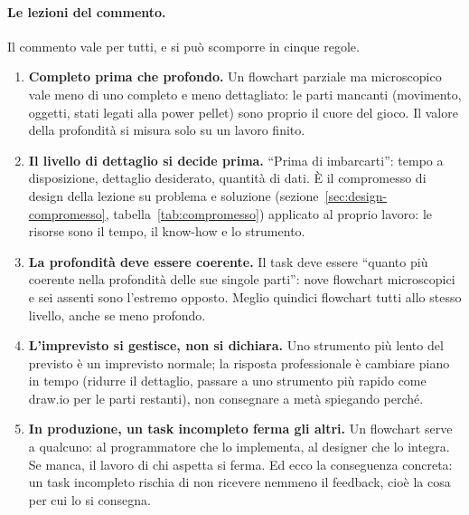 \paragraph{Le lezioni del commento.} Il commento vale per tutti, e si può
scomporre in cinque regole.
\begin{enumerate}
  \item \textbf{Completo prima che profondo.} Un flowchart parziale ma
        microscopico vale meno di uno completo e meno dettagliato: le parti
        mancanti (movimento, oggetti, stati legati alla power pellet) sono
        proprio il cuore del gioco. Il valore della profondità si misura solo
        su un lavoro finito.
  \item \textbf{Il livello di dettaglio si decide prima.} ``Prima di
        imbarcarti'': tempo a disposizione, dettaglio desiderato, quantità di
        dati. È il compromesso di design della lezione su problema e soluzione
        (sezione~\ref{sec:design-compromesso},
        tabella~\ref{tab:compromesso}) applicato al proprio lavoro: le risorse
        sono il tempo, il know-how e lo strumento.
  \item \textbf{La profondità deve essere coerente.} Il task deve essere ``quanto
        più coerente nella profondità delle sue singole parti'': nove
        flowchart microscopici e sei assenti sono l'estremo opposto. Meglio
        quindici flowchart tutti allo stesso livello, anche se meno
        profondo.
  \item \textbf{L'imprevisto si gestisce, non si dichiara.} Uno strumento più
        lento del previsto è un imprevisto normale; la risposta professionale
        è cambiare piano in tempo (ridurre il dettaglio, passare a uno
        strumento più rapido come draw.io per le parti restanti), non
        consegnare a metà spiegando perché.
  \item \textbf{In produzione, un task incompleto ferma gli altri.} Un
        flowchart serve a qualcuno: al programmatore che lo implementa, al
        designer che lo integra. Se manca, il lavoro di chi aspetta si ferma.
        Ed ecco la conseguenza concreta: un task incompleto rischia di non
        ricevere nemmeno il feedback, cioè la cosa per cui lo si consegna.
\end{enumerate}

